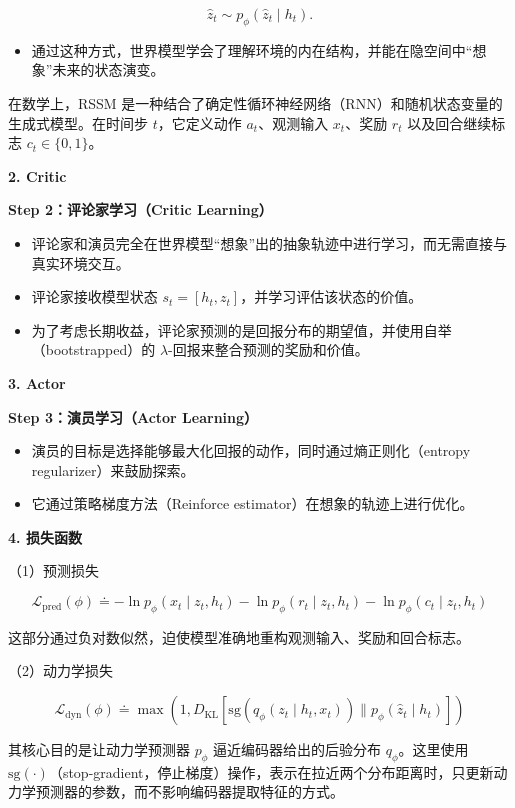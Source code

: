 \[
\hat{z}_t \sim p_{\phi}(\hat{z}_t \mid h_t).
\]

\begin{itemize}
\tightlist
\item
  通过这种方式，世界模型学会了理解环境的内在结构，并能在隐空间中``想象''未来的状态演变。
\end{itemize}

在数学上，RSSM 是一种结合了确定性循环神经网络（RNN）和随机状态变量的生成式模型。在时间步 \(t\)，它定义动作 \(a_t\)、观测输入 \(x_t\)、奖励 \(r_t\) 以及回合继续标志 \(c_t \in \{0, 1\}\)。

\textbf{2. Critic}

\textbf{Step 2：评论家学习（Critic Learning）}

\begin{itemize}
\tightlist
\item
  评论家和演员完全在世界模型``想象''出的抽象轨迹中进行学习，而无需直接与真实环境交互。
\item
  评论家接收模型状态 \(s_t = [h_t, z_t]\)，并学习评估该状态的价值。
\item
  为了考虑长期收益，评论家预测的是回报分布的期望值，并使用自举（bootstrapped）的 \(\lambda\)-回报来整合预测的奖励和价值。
\end{itemize}

\textbf{3. Actor}

\textbf{Step 3：演员学习（Actor Learning）}

\begin{itemize}
\tightlist
\item
  演员的目标是选择能够最大化回报的动作，同时通过熵正则化（entropy regularizer）来鼓励探索。
\item
  它通过策略梯度方法（Reinforce estimator）在想象的轨迹上进行优化。
\end{itemize}

\textbf{4. 损失函数}

（1）预测损失

\[
\mathcal{L}_{\mathrm{pred}}(\phi)
\doteq
-\ln p_{\phi}(x_t \mid z_t, h_t)
-\ln p_{\phi}(r_t \mid z_t, h_t)
-\ln p_{\phi}(c_t \mid z_t, h_t)
\]

这部分通过负对数似然，迫使模型准确地重构观测输入、奖励和回合标志。

（2）动力学损失

\[
\mathcal{L}_{\mathrm{dyn}}(\phi)
\doteq
\max\left(
1,
D_{\mathrm{KL}}\left[
\mathrm{sg}(q_{\phi}(z_t \mid h_t, x_t))
\parallel
p_{\phi}(\hat{z}_t \mid h_t)
\right]
\right)
\]

其核心目的是让动力学预测器 \(p_{\phi}\) 逼近编码器给出的后验分布 \(q_{\phi}\)。这里使用 \(\mathrm{sg}(\cdot)\)（stop-gradient，停止梯度）操作，表示在拉近两个分布距离时，只更新动力学预测器的参数，而不影响编码器提取特征的方式。

